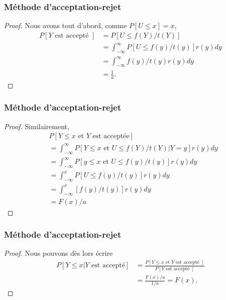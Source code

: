 \documentclass[t,usepdftitle=false]{beamer}
\begin{document}
\begin{frame}
\frametitle{Méthode d'acceptation-rejet}

\begin{proof}
Nous avons tout d'abord, comme $P[U \leq x] = x$,
\begin{align*}
P [Y\mbox{ est accepté }] & = P [ U \leq f (Y)/t(Y) ] \\
& = \int_{-\infty}^{\infty} P [U \leq f (y)/t(y)] r(y)dy \\
& = \int_{-\infty}^{\infty} f (y)/t(y) r(y)dy \\
& = \frac{1}{a}.
\end{align*}
\end{proof}

\end{frame}

\begin{frame}
\frametitle{Méthode d'acceptation-rejet}

\begin{proof}
Similairement,
\begin{align*}
& P [Y \leq x \mbox{ et } Y \mbox{ est acceptée}] \\
& = \int_{-\infty}^{\infty} P [Y \leq x \mbox{ et } U \leq f (Y )/t(Y ) | Y = y ]r(y )dy \\
& = \int_{-\infty}^{\infty} P [y \leq x \mbox{ et } U \leq f (y)/t(y)]
r(y) dy \\
& = \int_{-\infty}^{x} P [U \leq f (y)/t(y)] r(y) dy \\
& = \int_{-\infty}^{x} [f(y)/t(y)]r(y)dy \\
& = F(x)/a 
\end{align*}
\end{proof}

\end{frame}

\begin{frame}
\frametitle{Méthode d'acceptation-rejet}

\begin{proof}
Nous pouvons dès lors écrire
\begin{align*}
P[Y \leq x | Y \mbox{ est accepté}] & =
\frac{P [Y \leq x \mbox{ et } Y \mbox{ est accepté }]}{P [Y\mbox{ est
    accepté }]} \\
& = \frac{F (x)/a}{1/a} = F (x).
\end{align*}
\end{proof}

\end{frame}
\end{document}
